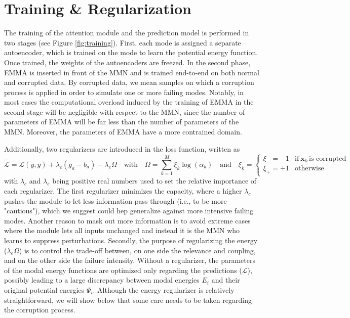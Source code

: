 \section{Training \& Regularization}\label{sec:regul}
The training of the attention module and the prediction model is performed in two stages (see Figure \ref{fig:training}). First, each mode is assigned a separate autoencoder, which is trained on the mode to learn the potential energy function. Once trained, the weights of the autoencoders are freezed. In the second phase, EMMA is inserted in front of the MMN and is trained end-to-end on both normal and corrupted data. By corrupted data, we mean samples on which a corruption process is applied in order to simulate one or more failing modes. Notably, in most cases the computational overload induced by the training of EMMA in the second stage will be negligible with respect to the MMN, since the number of parameters of EMMA will be far less than the number of parameters of the MMN. Moreover, the parameters of EMMA have a more contrained domain.

Additionally, two regularizers are introduced in the loss function, written as
\begin{equation}
\tilde{\mathcal{L}} = \mathcal{L}(y,\hat{y}) + \lambda_c(g_a-b_a) - \lambda_e \Omega \quad \text{with} \quad \Omega = \sum_{k=1}^M \xi_k \log(\alpha_k) \quad \text{and} \quad \xi_k = \begin{cases}
      \xi_- = -1 & \text{if}\ \mathbf{x}_k\, \text{is corrupted} \\
      \xi_+ = +1 & \text{otherwise}
    \end{cases}
\label{eq:regularization}
\end{equation}
with $\lambda_c$ and $\lambda_e$ being positive real numbers used to set the relative importance of each regularizer. The first regularizer minimizes the capacity, where a higher $\lambda_c$ pushes the module to let less information pass through (i.e., to be more "cautious"), which we suggest could hep generalize against more intensive failing modes. Another reason to mask out more information is to avoid extreme cases where the module lets all inputs unchanged and instead it is the MMN who learns to suppress perturbations. Secondly, the purpose of regularizing the energy ($\lambda_e \Omega$) is to control the trade-off between, on one side the relevance and coupling, and on the other side the failure intensity. Without a regularizer, the parameters of the modal energy functions are optimized only regarding the predictions ($\mathcal{L}$), possibly leading to a large discrepancy between modal energies $E_i$ and their original potential energies $\Psi_i$. Although the energy regularizer is relatively straightforward, we will show below that some care needs to be taken regarding the corruption process.

